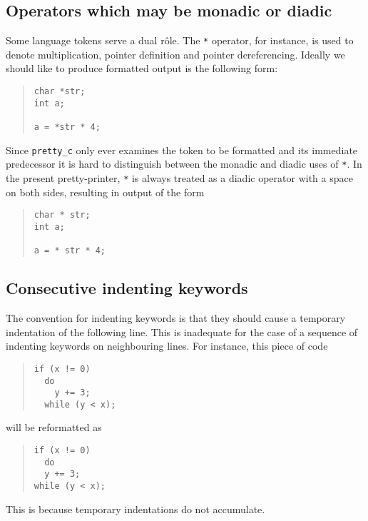 \subsection{Operators which may be monadic or diadic}
\label{bad:diadic}
Some language tokens serve a dual r\^ole. The \verb+*+ operator, for instance,
is used to denote
multiplication, pointer definition and pointer dereferencing. Ideally we should like
to produce formatted output is the following form:
\begin{quote}
\small
\begin{verbatim}
char *str;
int a;

a = *str * 4;
\end{verbatim}
\end{quote}
Since \verb+pretty_c+ only ever examines the token to be formatted and its immediate 
predecessor it is hard to distinguish between the monadic and diadic uses of \verb+*+. In the
present pretty-printer, \verb+*+ is always treated as a diadic operator with a space on
both sides, resulting in output of the form
\begin{quote}
\small
\begin{verbatim}
char * str;
int a;

a = * str * 4;
\end{verbatim}
\end{quote}

\subsection{Consecutive indenting keywords}
\label{double:indent}
The convention for indenting keywords is that they should cause a temporary indentation
of the following line. This is inadequate for the case of a sequence of indenting keywords
on neighbouring lines. For instance, this piece of code
\begin{quote}
\small
\begin{verbatim}
if (x != 0) 
  do
    y += 3;
  while (y < x); 
\end{verbatim}
\end{quote}
will be reformatted as
\begin{quote}
\small
\begin{verbatim}
if (x != 0) 
  do
  y += 3;
while (y < x); 
\end{verbatim}
\end{quote}
This is because temporary indentations do not accumulate.
